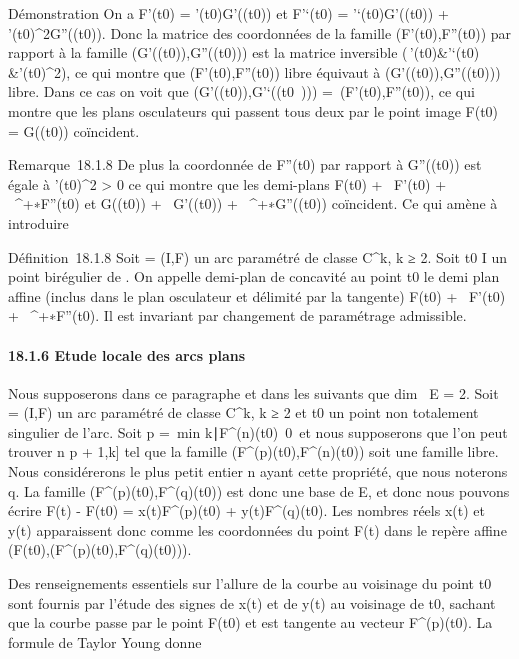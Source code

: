Démonstration On a F'(t0) =
\theta'(t0)G'(\theta(t0)) et F'`(t0) =
\theta'`(t0)G'(\theta(t0)) +
\theta'(t0)^2G''(\theta(t0)). Donc la matrice des
coordonnées de la famille (F'(t0),F''(t0)) par
rapport à la famille (G'(\theta(t0)),G''(\theta(t0))) est la
matrice inversible \left
(\matrix\,\theta'(t0)&\theta'`(t0)
&\theta'(t0)^2\right ), ce qui montre
que (F'(t0),F''(t0)) libre équivaut à
(G'(\theta(t0)),G''(\theta(t0))) libre. Dans ce cas on voit
que
\mathrmVect(G'(\theta(t0)),G'`(\theta(t0~)))
=\
\mathrmVect(F'(t0),F''(t0)), ce
qui montre que les plans osculateurs qui passent tous deux par le point
image F(t0) = G(\theta(t0)) coïncident.

Remarque~18.1.8 De plus la coordonnée de F''(t0) par rapport à
G''(\theta(t0)) est égale à \theta'(t0)^2
\textgreater{} 0 ce qui montre que les demi-plans F(t0) +
~F'(t0) + ~^+∗F''(t0) et
G(\theta(t0)) + ~G'(\theta(t0)) +
\mathbb{R}~^+∗G''(\theta(t0)) coïncident. Ce qui amène à
introduire

Définition~18.1.8 Soit \Gamma = (I,F) un arc paramétré de classe
C^k, k ≥ 2. Soit t0 \in I un point birégulier de \Gamma.
On appelle demi-plan de concavité au point t0 le demi plan
affine (inclus dans le plan osculateur et délimité par la tangente)
F(t0) + ~F'(t0) + \mathbb{R}~^+∗F''(t0).
Il est invariant par changement de paramétrage admissible.

\paragraph{18.1.6 Etude locale des arcs plans}

Nous supposerons dans ce paragraphe et dans les suivants que
dim~ E = 2. Soit \Gamma = (I,F) un arc paramétré de
classe C^k, k ≥ 2 et t0 un point non totalement
singulier de l'arc. Soit p =\
min\n \leq
k∣F^(n)(t0)\mathrel\neq~0\
et nous supposerons que l'on peut trouver n \in {[}p + 1,k{]} tel que la
famille (F^(p)(t0),F^(n)(t0))
soit une famille libre. Nous considérerons le plus petit entier n ayant
cette propriété, que nous noterons q. La famille
(F^(p)(t0),F^(q)(t0)) est donc
une base de E, et donc nous pouvons écrire F(t) - F(t0) =
x(t)F^(p)(t0) + y(t)F^(q)(t0).
Les nombres réels x(t) et y(t) apparaissent donc comme les coordonnées
du point F(t) dans le repère affine
(F(t0),(F^(p)(t0),F^(q)(t0))).

Des renseignements essentiels sur l'allure de la courbe au voisinage du
point t0 sont fournis par l'étude des signes de x(t) et de
y(t) au voisinage de t0, sachant que la courbe passe par le
point F(t0) et est tangente au vecteur
F^(p)(t0). La formule de Taylor Young donne


